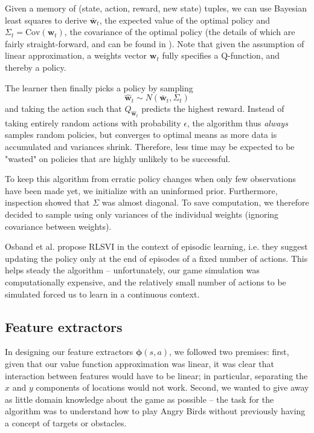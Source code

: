 \documentclass[fleqn,10pt]{SelfArx} %
\begin{document}
Given a memory of (state, action, reward, new state) tuples, we can use Bayesian least squares to derive $\bar{\mathbf{w}}_t$, the expected value of the optimal policy and $\Sigma_t=\mathrm{Cov}(\mathbf{w}_t)$, the covariance of the optimal policy (the details of which are fairly straight-forward, and can be found in \cite{osband2014generalization}). Note that given the assumption of linear approximation, a weights vector $\mathbf{w}_t$ fully specifies a Q-function, and thereby a policy.

The learner then finally picks a policy by sampling 
\[\hat{\mathbf{w}}_t \sim N(\bar{\mathbf{w}}_t, \Sigma_t)\]
and taking the action such that $Q_{\hat{\mathbf{w}}_t}$ predicts the highest reward. Instead of taking entirely random actions with probability $\epsilon$, the algorithm thus \emph{always} samples random policies, but converges to optimal means as more data is accumulated and variances shrink. Therefore, less time may be expected to be "wasted" on policies that are highly unlikely to be successful.

To keep this algorithm from erratic policy changes when only few observations have been made yet, we initialize with an uninformed prior. Furthermore, inspection showed that $\Sigma$ was almost diagonal. To save computation, we therefore decided to sample using only variances of the individual weights (ignoring covariance between weights).

Osband et al. propose RLSVI in the context of episodic learning, i.e. they suggest updating the policy only at the end of episodes of a fixed number of actions. This helps steady the algorithm -- unfortunately, our game simulation was computationally expensive, and the relatively small number of actions to be simulated forced us to learn in a continuous context. 

\subsection{Feature extractors}	

In designing our feature extractors $\mathbf{\phi}(s,a)$, we followed two premises: first, given that our value function approximation was linear, it was clear that interaction between features would have to be linear; in particular, separating the $x$ and $y$ components of locations would not work. Second, we wanted to give away as little domain knowledge about the game as possible -- the task for the algorithm was to understand how to play Angry Birds without previously having a concept of targets or obstacles.
\end{document}
